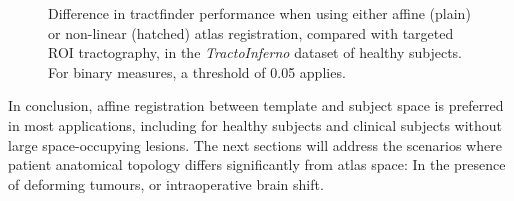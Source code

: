 \begin{figure}
  \caption{Difference in tractfinder performance when using either affine (plain) or non-linear (hatched) atlas registration, compared with targeted ROI tractography, in the \textit{TractoInferno} dataset of healthy subjects. For binary measures, a threshold of 0.05 applies.}
  \label{fig:nrr}
\end{figure}

In conclusion, affine registration between template and subject space is preferred in most applications, including for healthy subjects and clinical subjects without large space-occupying lesions.
The next sections will address the scenarios where patient anatomical topology differs significantly from atlas space:
In the presence of deforming tumours, or intraoperative brain shift.
